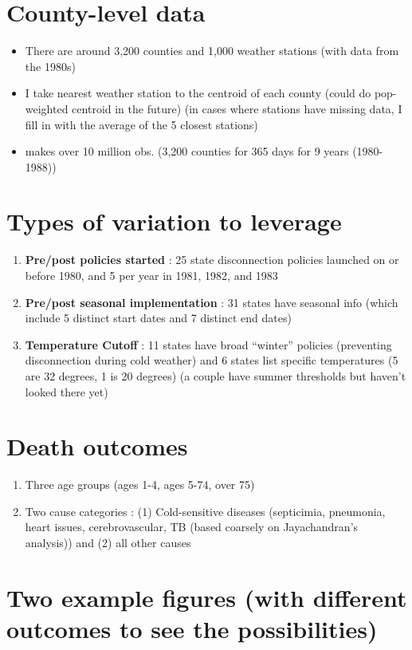\documentclass[12pt]{article}
\begin{document}
\section*{County-level data}
\begin{itemize}
\item There are around 3,200 counties and 1,000 weather stations (with data from the 1980s)
\item I take nearest weather station to the centroid of each county (could do pop-weighted centroid in the future) (in cases where stations have missing data, I fill in  with the average of the 5 closest stations)
\item makes over 10 million obs.  (3,200 counties for 365 days for 9 years (1980-1988))
\end{itemize}

\section*{Types of variation to leverage}
\begin{enumerate}
\item \textbf{Pre/post policies started} : 25 state disconnection policies launched on or before 1980, and 5 per year in 1981, 1982, and 1983
\item \textbf{Pre/post seasonal implementation} : 31 states have seasonal info (which include 5 distinct start dates and 7 distinct end dates) 
\item \textbf{Temperature Cutoff} : 11 states have broad ``winter'' policies (preventing disconnection during cold weather) and 6 states list specific temperatures (5 are 32 degrees, 1 is 20 degrees) (a couple have summer thresholds but haven't looked there yet)
\end{enumerate}

\section*{Death outcomes}
\begin{enumerate}
\item Three age groups (ages 1-4, ages 5-74, over 75)
\item Two cause categories : (1) Cold-sensitive diseases (septicimia, pneumonia, heart issues, cerebrovascular, TB (based coarsely on Jayachandran's analysis)) and (2) all other causes 
\end{enumerate}

\section*{Two example figures (with different outcomes to see the possibilities)}
\end{document}
